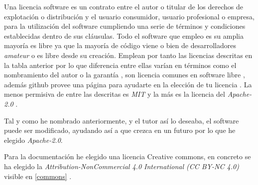 Una licencia software es un contrato entre el autor o titular de los derechos de explotación o distribución y el usuario consumidor, usuario profesional o empresa, para la utilización del software cumpliendo una serie de términos y condiciones establecidas dentro de sus cláusulas. Todo el software que empleo es su amplia mayoría es libre ya que la mayoría de código viene o bien de desarrolladores \emph{amateur} o es libre desde su creación. Emplean por tanto las licencias descritas en la tabla anterior por lo que diferencia entre ellas varían en términos como el nombramiento del autor o la garantía , son licencia comunes en software libre \cite{githublicense} , además github provee una página para ayudarte en la elección de tu licencia \citep{githubchoose}. La menos permisiva de entre las descritas es \emph{MIT} \citep{mit}  y la más es la licencia del  \emph{Apache-2.0} \cite{apache}.




Tal y como he nombrado anteriormente, y el tutor así lo deseaba, el software puede ser modificado, ayudando así a que crezca en un futuro
por lo que he elegido \emph{Apache-2.0}. 


Para la documentación he elegido una licencia Creative commons, en concreto se ha elegido la \emph{Attribution-NonCommercial 4.0 International (CC BY-NC 4.0)} visible en \ref{commons} .


\label{commons}



